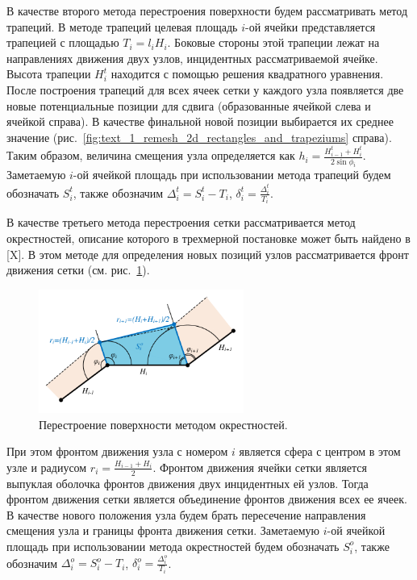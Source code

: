 \documentclass[
11pt,%
tightenlines,%
twoside,%
onecolumn,%
nofloats,%
nobibnotes,%
nofootinbib,%
superscriptaddress,%
noshowpacs,%
centertags]%
{revtex4}
\begin{document}
В качестве второго метода перестроения поверхности будем рассматривать метод трапеций.
В методе трапеций целевая площадь $i$-ой ячейки представляется трапецией с площадью $T_i = l_i H_i$.
Боковые стороны этой трапеции лежат на направлениях движения двух узлов, инцидентных рассматриваемой ячейке.
Высота трапеции $H_i^t$ находится с помощью решения квадратного уравнения.
После построения трапеций для всех ячеек сетки у каждого узла появляется две новые потенциальные позиции для сдвига (образованные ячейкой слева и ячейкой справа).
В качестве финальной новой позиции выбирается их среднее значение (рис.~\ref{fig:text_1_remesh_2d_rectangles_and_trapeziums} справа).
Таким образом, величина смещения узла определяется как $h_i = \frac{H_{i - 1}^t + H_i^t}{2 \sin \phi_i}$.
Заметаемую $i$-ой ячейкой площадь при использовании метода трапеций будем обозначать $S_i^t$, также обозначим $\Delta_i^t = S_i^t - T_i$, $\delta_i^t = \frac{\Delta_i^t}{T_i}$.

В качестве третьего метода перестроения сетки рассматривается метод окрестностей, описание которого в трехмерной постановке может быть найдено в [X].
В этом методе для определения новых позиций узлов рассматривается фронт движения сетки (см. рис.~\ref{fig:text_1_remesh_2d_okrestnost}).

\begin{figure}[ht]
\setcaptionmargin{5mm}
\onelinecaptionstrue  %
\includegraphics[width=0.6\textwidth]{pics/remesh_okrestnost.pdf}
\caption{Перестроение поверхности методом окрестностей.}
\label{fig:text_1_remesh_2d_okrestnost}
\end{figure}

При этом фронтом движения узла с номером $i$ является сфера с центром в этом узле и радиусом $r_i = \frac{H_{i - 1} + H_i}{2}$.
Фронтом движения ячейки сетки является выпуклая оболочка фронтов движения двух инцидентных ей узлов.
Тогда фронтом движения сетки является объединение фронтов движения всех ее ячеек.
В качестве нового положения узла будем брать пересечение направления смещения узла и границы фронта движения сетки.
Заметаемую $i$-ой ячейкой площадь при использовании метода окрестностей будем обозначать $S_i^o$, также обозначим $\Delta_i^o = S_i^o - T_i$, $\delta_i^o = \frac{\Delta_i^o}{T_i}$.
\end{document}
